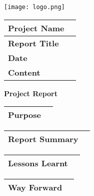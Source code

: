 \documentclass[a4paper,12pt]{article}
\date{07/09/2016}
\author{Preshane Pillay}
\begin{document}
   \centering
      
	{\texttt{[image: logo.png]} \\

\vspace{1cm}
    
      \begin{tabular}{|p{3cm}|p{09cm}|}
	\hline
	{\bfseries Project Name} & {} \\
	\hline
	{\bfseries Report Title} & {} \\
	\hline
	{\bfseries Date} & {} \\
	\hline
	{\bfseries Content} & {} \\
	\hline
    \end{tabular}

\pagebreak    
    
\begin{Large}
	{\bfseries Project Report} \\ 
\end{Large}
      \vspace{2cm}

      \begin{tabular}{|p{3cm}|p{09cm}|}
       \hline
       {\bfseries Purpose} & {} \\
       \hline
      \end{tabular}
      
    \vspace{2cm}

      \begin{tabular}{|p{3cm}|p{09cm}|}
       \hline
       {\bfseries Report Summary} & {} \\
       \hline
      \end{tabular}
      
     \vspace{2cm}
      
      \begin{tabular}{|p{3cm}|p{09cm}|}
       \hline
       {\bfseries Lessons Learnt} & {} \\
       \hline
      \end{tabular} 
      
      \vspace{2cm}
      }
      \begin{tabular}{|p{3cm}|p{09cm}|}
       \hline
       {\bfseries Way Forward} & {} \\
       \hline
      \end{tabular}
      
     
 
\end{document}
